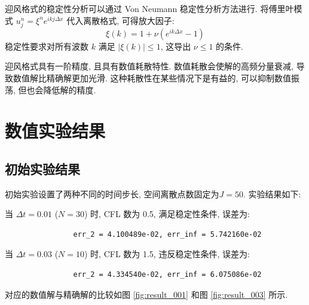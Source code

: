 \documentclass[12pt,a4paper]{article}
\begin{document}
        迎风格式的稳定性分析可以通过 Von Neumann 稳定性分析方法进行. 将傅里叶模式 $u_j^{n} = \xi^{n} e^{ikj\Delta x}$ 代入离散格式, 可得放大因子:
        \begin{equation}
            \xi\left(k\right) = 1 + \nu\left(e^{ik\Delta x} - 1\right)
        \end{equation}
        稳定性要求对所有波数 $k$ 满足 $\left\lvert\xi\left(k\right)\right\rvert \leq 1$, 这导出 $\nu \leq 1$ 的条件.

        迎风格式具有一阶精度, 且具有数值耗散特性. 数值耗散会使解的高频分量衰减, 导致数值解比精确解更加光滑. 这种耗散性在某些情况下是有益的, 可以抑制数值振荡, 但也会降低解的精度.

    \section{数值实验结果}
        \subsection{初始实验结果}
            初始实验设置了两种不同的时间步长, 空间离散点数固定为$J=50$. 实验结果如下:

            当 $\Delta t = 0.01$ ($N=30$) 时, CFL 数为 0.5, 满足稳定性条件, 误差为:
            \begin{verbatim}
                err_2 = 4.100489e-02, err_inf = 5.742160e-02
            \end{verbatim}

            当 $\Delta t = 0.03$ ($N=10$) 时, CFL 数为 1.5, 违反稳定性条件, 误差为:
            \begin{verbatim}
                err_2 = 4.334540e-02, err_inf = 6.075086e-02
            \end{verbatim}

            对应的数值解与精确解的比较如图 \ref{fig:result_001} 和图 \ref{fig:result_003} 所示.
\end{document}
